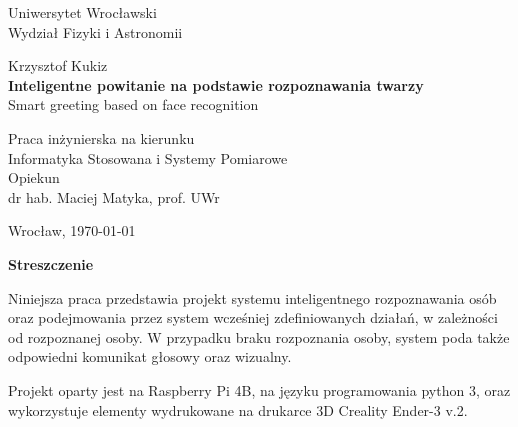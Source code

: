\documentclass[a4paper,12pt,reqno]{article}
\begin{document}


\begin{center}

\thispagestyle{empty}

\Large 
Uniwersytet Wrocławski\\
Wydział Fizyki i Astronomii\\
\vspace{0.8cm}
\vspace{1.8cm}

\Large Krzysztof Kukiz \\
\vspace{3.2cm}
\Large \textbf{Inteligentne powitanie na podstawie rozpoznawania twarzy} \\
\vspace{1.5cm}
Smart greeting based on face recognition
\end{center}
\vspace{3.7cm}
\begin{flushright}
\large{Praca inżynierska na kierunku \\Informatyka Stosowana i Systemy Pomiarowe \\}
\vspace{0.5cm}
\large{ Opiekun \\ dr hab. Maciej Matyka, prof. UWr}
\end{flushright}
\vspace{2.2cm}

\begin{center}
\large Wrocław, \today
\end{center}

\newpage

\tableofcontents

\newpage

%
%
\begin{flushleft}
\Large \textbf{Streszczenie}
\end{flushleft}
\vspace{1cm}

Niniejsza praca przedstawia projekt systemu inteligentnego rozpoznawania osób oraz podejmowania przez system wcześniej zdefiniowanych działań, w zależności od rozpoznanej osoby. W przypadku braku rozpoznania osoby, system poda także odpowiedni komunikat głosowy oraz wizualny. 

Projekt oparty jest na Raspberry Pi 4B, na języku programowania python 3, oraz wykorzystuje elementy wydrukowane na drukarce 3D Creality Ender-3 v.2.
\end{document}
